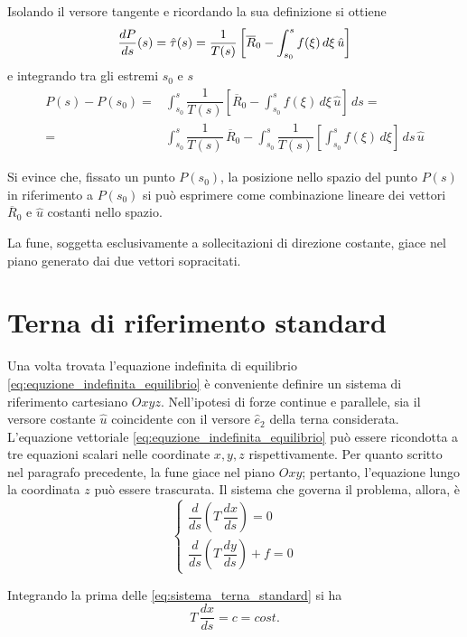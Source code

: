  Isolando il versore tangente e ricordando la sua definizione si ottiene
 \[
\dfrac{dP}{ds}(s)	 = \hat{\tau} (s) = \dfrac{1}{T(s)}\left[\overline{R}_0 - \int_{s_0}^s f(\xi)\,d\xi\,\hat{u}\right]
 \]
e integrando tra gli estremi $s_0$ e $s$
\begin{align*}
P(s)	 - P(s_0) =& \int_{s_0}^s \dfrac{1}{T(s)}\left[\overline{R}_0 - \int_{s_0}^s f(\xi)\,d\xi\,\hat{u}\right]\,ds = \\
=& \int_{s_0}^s \dfrac{1}{T(s)}\,\overline{R}_0 - \int_{s_0}^s \dfrac{1}{T(s)}\left[\int_{s_0}^s f(\xi)\,d\xi\right]\,ds\,\hat{u}
\end{align*}

Si evince che, fissato un punto $P(s_0)$, la posizione nello spazio del punto $P(s)$ in riferimento a $P(s_0)$ si può esprimere come combinazione lineare dei vettori $\overline{R}_0$ e $\hat{u}$ costanti nello spazio.

La fune, soggetta esclusivamente a sollecitazioni di direzione costante, giace nel piano generato dai due vettori sopracitati.

\section{Terna di riferimento standard}
Una volta trovata l'equazione indefinita di equilibrio \eqref{eq:equzione_indefinita_equilibrio} è conveniente definire un sistema di riferimento cartesiano $Oxyz$. Nell'ipotesi di forze continue e parallele, sia il versore costante $\hat{u}$ coincidente con il versore $\hat{e}_2$ della terna considerata. 
L'equazione vettoriale \eqref{eq:equzione_indefinita_equilibrio} può essere ricondotta a tre equazioni scalari nelle coordinate $x, y, z$ rispettivamente. Per quanto scritto nel paragrafo precedente, la fune giace nel piano $Oxy$; pertanto, l'equazione lungo la coordinata $z$ può essere trascurata. Il sistema che governa il problema, allora, è
\begin{equation}
	\label{eq:sistema_terna_standard}
	\begin{cases}
		\dfrac{d}{ds}\left(T\,\dfrac{dx}{ds}\right) = 0\\[1.5ex]
		\dfrac{d}{ds}\left(T\,\dfrac{dy}{ds}\right) + f = 0
	\end{cases}
\end{equation}

Integrando la prima delle \eqref{eq:sistema_terna_standard} si ha
\begin{equation}
	\label{eq:tensione_direzione_x}
T\,\dfrac{dx}{ds} = c = cost.	
\end{equation}

